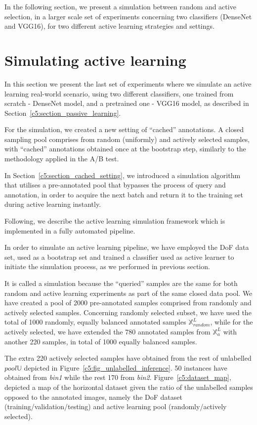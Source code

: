 In the following section, we present a simulation between random and active selection, in a larger scale set of experiments concerning two classifiers (DenseNet and VGG16), for two different active learning strategies and settings.


\section{Simulating active learning}
\label{c5:section_al_simulation}

In this section we present the last set of experiments where we simulate an active learning real-world scenario, using two different classifiers, one trained from scratch - DenseNet model, and a pretrained one - VGG16 model, as described in Section~\ref{c5:section_passive_learning}.

For the simulation, we created a new setting of ``cached'' annotations. 
A closed sampling pool comprises from random (uniformly) and actively selected samples, with ``cached'' annotations obtained once at the bootstrap step, similarly to the methodology applied in the A/B test.

In Section~\ref{c5:section_cached_setting}, we introduced a simulation algorithm that utilises a pre-annotated pool that bypasses the process of query and annotation, in order to acquire the next batch and return it to the training set during active learning instantly.

Following, we describe the active learning simulation framework which is implemented in a fully automated pipeline.

In order to simulate an active learning pipeline, we have employed the DoF data set, used as a bootstrap set and trained a classifier used as active learner to initiate the simulation process, as we performed in previous section.

It is called a simulation because the ``queried'' samples are the same for both random and active learning experiments as part of the same closed data pool.
We have created a pool of 2000 pre-annotated samples comprised from randomly and actively selected samples.
Concerning randomly selected subset, we have used the total of 1000 randomly, equally balanced annotated samples $\mathbb{X}^L_{random}$, while for the actively selected, we have extended the 780 annotated samples from $\mathbb{X}^L_{a}$ with another 220 samples, in total of 1000 equally balanced samples.

The extra 220 actively selected samples have obtained from the rest of unlabelled $pool\mathbb{U}$ depicted in Figure~\ref{c5:fig_unlabelled_inference}. 50 instances have obtained from \textit{bin1} while the rest 170 from \textit{bin2}.
Figure~\ref{c5:dataset_map}, depicted a map of the horizontal dataset given the ratio of the unlabelled samples opposed to the annotated images, namely the DoF dataset (training/validation/testing) and active learning pool (randomly/actively selected).

